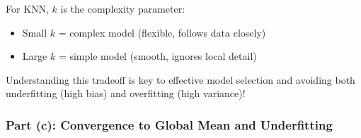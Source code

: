\documentclass[12pt]{article}
\begin{document}
\begin{explanation}
For KNN, \(k\) is the complexity parameter:
\begin{itemize}
    \item Small \(k\) = complex model (flexible, follows data closely)
    \item Large \(k\) = simple model (smooth, ignores local detail)
\end{itemize}

Understanding this tradeoff is key to effective model selection and avoiding both underfitting (high bias) and overfitting (high variance)!
\end{explanation}

\newpage
\subsubsection{Part (c): Convergence to Global Mean and Underfitting}
\end{document}
